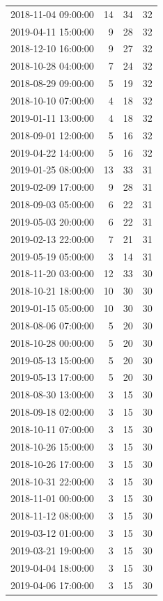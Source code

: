 \begin{tabular}{lrrr}
2018-11-04 09:00:00 & 14 & 34 & 32 \\
2019-04-11 15:00:00 & 9 & 28 & 32 \\
2018-12-10 16:00:00 & 9 & 27 & 32 \\
2018-10-28 04:00:00 & 7 & 24 & 32 \\
2018-08-29 09:00:00 & 5 & 19 & 32 \\
2018-10-10 07:00:00 & 4 & 18 & 32 \\
2019-01-11 13:00:00 & 4 & 18 & 32 \\
2018-09-01 12:00:00 & 5 & 16 & 32 \\
2019-04-22 14:00:00 & 5 & 16 & 32 \\
2019-01-25 08:00:00 & 13 & 33 & 31 \\
2019-02-09 17:00:00 & 9 & 28 & 31 \\
2018-09-03 05:00:00 & 6 & 22 & 31 \\
2019-05-03 20:00:00 & 6 & 22 & 31 \\
2019-02-13 22:00:00 & 7 & 21 & 31 \\
2019-05-19 05:00:00 & 3 & 14 & 31 \\
2018-11-20 03:00:00 & 12 & 33 & 30 \\
2018-10-21 18:00:00 & 10 & 30 & 30 \\
2019-01-15 05:00:00 & 10 & 30 & 30 \\
2018-08-06 07:00:00 & 5 & 20 & 30 \\
2018-10-28 00:00:00 & 5 & 20 & 30 \\
2019-05-13 15:00:00 & 5 & 20 & 30 \\
2019-05-13 17:00:00 & 5 & 20 & 30 \\
2018-08-30 13:00:00 & 3 & 15 & 30 \\
2018-09-18 02:00:00 & 3 & 15 & 30 \\
2018-10-11 07:00:00 & 3 & 15 & 30 \\
2018-10-26 15:00:00 & 3 & 15 & 30 \\
2018-10-26 17:00:00 & 3 & 15 & 30 \\
2018-10-31 22:00:00 & 3 & 15 & 30 \\
2018-11-01 00:00:00 & 3 & 15 & 30 \\
2018-11-12 08:00:00 & 3 & 15 & 30 \\
2019-03-12 01:00:00 & 3 & 15 & 30 \\
2019-03-21 19:00:00 & 3 & 15 & 30 \\
2019-04-04 18:00:00 & 3 & 15 & 30 \\
2019-04-06 17:00:00 & 3 & 15 & 30 \\

\end{tabular}
